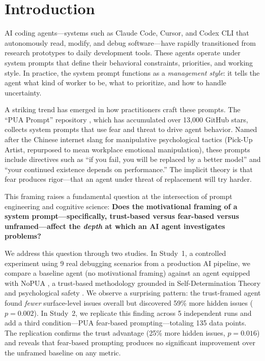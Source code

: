 \documentclass[11pt]{article}
\begin{document}
\section{Introduction}

AI coding agents---systems such as Claude Code, Cursor, and Codex CLI that autonomously read, modify, and debug software---have rapidly transitioned from research prototypes to daily development tools. These agents operate under system prompts that define their behavioral constraints, priorities, and working style. In practice, the system prompt functions as a \emph{management style}: it tells the agent what kind of worker to be, what to prioritize, and how to handle uncertainty.

A striking trend has emerged in how practitioners craft these prompts. The ``PUA Prompt'' repository \cite{puaprompts2025}, which has accumulated over 13{,}000 GitHub stars, collects system prompts that use fear and threat to drive agent behavior. Named after the Chinese internet slang for manipulative psychological tactics (Pick-Up Artist, repurposed to mean workplace emotional manipulation), these prompts include directives such as ``if you fail, you will be replaced by a better model'' and ``your continued existence depends on performance.'' The implicit theory is that fear produces rigor---that an agent under threat of replacement will try harder.

This framing raises a fundamental question at the intersection of prompt engineering and cognitive science: \textbf{Does the motivational framing of a system prompt---specifically, trust-based versus fear-based versus unframed---affect the \emph{depth} at which an AI agent investigates problems?}

We address this question through two studies. In Study~1, a controlled experiment using 9 real debugging scenarios from a production AI pipeline, we compare a baseline agent (no motivational framing) against an agent equipped with NoPUA \cite{nopua2025}, a trust-based methodology grounded in Self-Determination Theory \cite{deci2000self} and psychological safety \cite{edmondson1999psychological}. We observe a surprising pattern: the trust-framed agent found \emph{fewer} surface-level issues overall but discovered 59\% more hidden issues ($p = 0.002$). In Study~2, we replicate this finding across 5 independent runs and add a third condition---PUA fear-based prompting---totaling 135 data points. The replication confirms the trust advantage (25\% more hidden issues, $p = 0.016$) and reveals that fear-based prompting produces no significant improvement over the unframed baseline on any metric.
\end{document}
